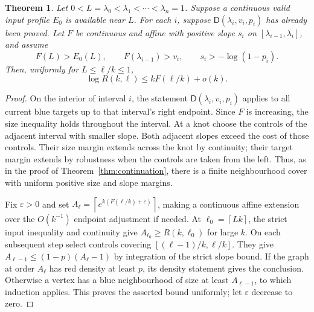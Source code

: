 \documentclass[11pt]{article}
\newtheorem{theorem}{Theorem}[section]
\theoremstyle{definition}
\theoremstyle{remark}
\newcommand{\D}{\mathsf D}
\newcommand{\ceil}[1]{\left\lceil #1\right\rceil}
\numberwithin{equation}{section}
\begin{document}
\begin{theorem}\label{thm:outer}
Let $0<L=\lambda_0<\lambda_1<\cdots<\lambda_n=1$. Suppose a continuous valid input profile $E_0$ is available near $L$. For each $i$, suppose $\D(\lambda_i,v_i,p_i)$ has already been proved. Let $F$ be continuous and affine with positive slope $s_i$ on $[\lambda_{i-1},\lambda_i]$, and assume
\[
 F(L)>E_0(L),\qquad
 F(\lambda_{i-1})>v_i,\qquad
 s_i>-\log(1-p_i).
\]
Then, uniformly for $L\le\ell/k\le1$,
\[
 \log R(k,\ell)\le kF(\ell/k)+o(k).
\]
\end{theorem}
\begin{proof}
On the interior of interval $i$, the statement $\D(\lambda_i,v_i,p_i)$ applies to all current blue targets up to that interval's right endpoint. Since $F$ is increasing, the size inequality holds throughout the interval. At a knot choose the controls of the adjacent interval with smaller slope. Both adjacent slopes exceed the cost of those controls. Their size margin extends across the knot by continuity; their target margin extends by robustness when the controls are taken from the left. Thus, as in the proof of Theorem~\ref{thm:continuation}, there is a finite neighbourhood cover with uniform positive size and slope margins.

Fix $\varepsilon>0$ and set $A_\ell=\ceil{e^{k(F(\ell/k)+\varepsilon)}}$, making a continuous affine extension over the $O(k^{-1})$ endpoint adjustment if needed. At $\ell_0=\ceil{Lk}$, the strict input inequality and continuity give $A_{\ell_0}\ge R(k,\ell_0)$ for large $k$. On each subsequent step select controls covering $[(\ell-1)/k,\ell/k]$. They give $A_{\ell-1}\le(1-p)(A_\ell-1)$ by integration of the strict slope bound. If the graph at order $A_\ell$ has red density at least $p$, its density statement gives the conclusion. Otherwise a vertex has a blue neighbourhood of size at least $A_{\ell-1}$, to which induction applies. This proves the asserted bound uniformly; let $\varepsilon$ decrease to zero.
\end{proof}
\end{document}
